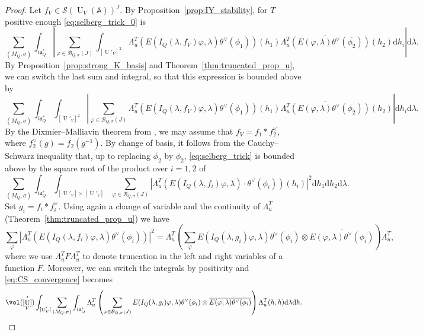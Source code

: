 \documentclass[letterpaper,11pt]{amsart}
\newcommand{\bA}{\mathbb{A}}
\newcommand{\cS}{\mathcal{S}}
\newcommand{\rd}{\mathrm{d}}
\newcommand{\<}{\negthickspace}
\newcommand{\valP}[1]{\left|#1\right|}
\DeclareMathOperator{\U}{U}
\theoremstyle{definition}
\theoremstyle{plain}
\theoremstyle{remark}
\numberwithin{equation}{section}
\begin{document}
\begin{proof}
Let $f_V \in \cS(\U_V(\bA))^J$. By Proposition~\ref{prop:IY_stability}, for $T$ positive enough \eqref{eq:selberg_trick_0} is
\begin{equation*}
    \sum_{(M_Q,\sigma)} \int_{ i \mathfrak{a}_Q^*} 
    \valP{\sum_{\varphi \in \mathcal{B}_{Q,\sigma}(J)} \int_{[\U'_V]^2}   \Lambda_u^T \left( E(I_Q(\lambda,f_V) \varphi,\lambda)
     \theta^\vee(\phi_1) \right)(h_1) \overline{\Lambda_u^T \left( E(\varphi,\lambda)
     \theta^\vee(\overline{\phi_2}) \right)}(h_2) \rd h_i} \rd \lambda.
\end{equation*} 
By Proposition~\ref{prop:strong_K_basis} and Theorem~\ref{thm:truncated_prop_u}, we can switch the last sum and integral, so that this expression is bounded above by
\begin{equation}
\label{eq:selberg_trick}
    \sum_{(M_Q,\sigma)} \int_{ i \mathfrak{a}_Q^*} 
    \int_{[\U'_V]^2}  \valP{\sum_{\varphi \in \mathcal{B}_{Q,\sigma}(J)}  \Lambda_u^T \left( E(I_Q(\lambda,f_V) \varphi,\lambda)
     \theta^\vee(\phi_1) \right)(h_1) \overline{\Lambda_u^T \left( E(\varphi,\lambda)
     \theta^\vee(\overline{\phi_2}) \right)}(h_2)} \rd h_i \rd \lambda.
\end{equation} 
By the Dixmier--Malliavin theorem from \cite{DM}, we may assume that $f_V=f_1 * f_2^{\vee}$, where $f_2^{\vee}(g)=\overline{f_2}(g^{-1})$. By change of basis, it follows from the Cauchy--Schwarz inequality that, up to replacing $\overline{\phi_2}$ by $\phi_2$, \eqref{eq:selberg_trick} is bounded above by the square root of the product over $i=1,2$ of
\begin{equation}
\label{eq:CS_convergence}
    \sum_{(M_Q,\sigma)} \int_{ i \mathfrak{a}_Q^*} \int_{[\U'_V] \times [\U'_V]} \sum_{\varphi \in \mathcal{B}_{Q,\sigma}(J)} \valP{\Lambda_u^T \left( E(I_Q(\lambda,f_i) \varphi,\lambda)
    \cdot \theta^\vee(\phi_i) \right)(h_i)}^2  \rd h_1 \rd h_2 \rd \lambda.
\end{equation}
Set $g_i=f_i*f_i^\vee$. Using again a change of variable and the continuity of $\Lambda_u^T$ (Theorem~\ref{thm:truncated_prop_u}) we have
\begin{equation}
\label{eq:positive_sum}
     \sum_{\varphi} \valP{\Lambda_u^T \left( E(I_Q(\lambda,f_i) \varphi,\lambda)
     \theta^\vee(\phi_i) \right) }^2= \Lambda_u^T \left(\sum_{\varphi } E(I_Q(\lambda,g_i) \varphi,\lambda)
     \theta^\vee(\phi_i) \otimes \overline{E(\varphi,\lambda)
     \theta^\vee(\phi_i)} \right) \Lambda_u^T,
\end{equation}
where we use $\Lambda_u^T F \Lambda_u^T$ to denote truncation in the left and right variables of a function $F$. Moreover, we can switch the integrals by positivity and \eqref{eq:CS_convergence} becomes 
\begin{equation}
\label{eq:Selberg_before_continuity}
    \vol([\U'_V]) \int_{[\U'_V]}  \sum_{(M_Q,\sigma)} \int_{ i \mathfrak{a}_Q^*}\Lambda_u^T \left(\sum_{\varphi \in \mathcal{B}_{Q,\sigma}(J)} E(I_Q(\lambda,g_i) \varphi,\lambda)
     \theta^\vee(\phi_i) \otimes \overline{E(\varphi,\lambda)
     \theta^\vee(\phi_i)} \right) \Lambda_u^T(h,h)   \rd \lambda \rd h.
\end{equation}


\end{proof}
\end{document}
